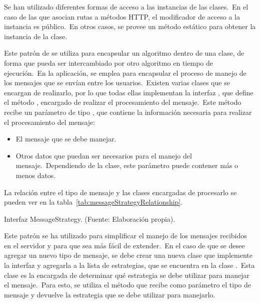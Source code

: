 Se han utilizado diferentes formas de acceso a las instancias de las clases.\ En el caso de las que asocian
rutas a métodos HTTP, el modificador de acceso a la instancia es público.\ En otros casos, se provee un método
estático para obtener la instancia de la clase.


Este patrón de  se utiliza para encapsular un algoritmo dentro de una clase, de forma que
pueda ser intercambiado por otro algoritmo en tiempo de ejecución.\ En la aplicación, se emplea para encapsular el
proceso de manejo de los mensajes que se envían entre los usuarios.\ Existen varias clases que se encargan de
realizarlo, por lo que todas ellas implementan la interfaz , que define el método
, encargado de realizar el procesamiento del mensaje.\ Este método recibe un
parámetro de tipo , que contiene la información necesaria para realizar el procesamiento
del mensaje:

\begin{itemize}
	\item El mensaje que se debe manejar.
	\item Otros datos que puedan ser necesarios para el manejo del mensaje.\ Dependiendo de la clase, este parámetro
	puede contener más o menos datos.
\end{itemize}
\label{itm:parametershandlestrategy}

La relación entre el tipo de mensaje y las clases encargadas de procesarlo se pueden ver en la
tabla~\ref{tab:messageStrategyRelationship}.

\begin{umlDiagram}
	\centering

	\caption{Interfaz MessageStrategy. (Fuente: Elaboración propia).}
\end{umlDiagram}

Este patrón se ha utilizado para simplificar el manejo de los mensajes recibidos en el servidor y para que sea más
fácil de extender.\ En el caso de que se desee agregar un nuevo tipo de mensaje, se debe crear una nueva clase que
implemente la interfaz  y agregarla a la lista de estrategias, que se encuentra en la
clase .\ Esta clase es la encargada de determinar qué estrategia se debe utilizar para
manejar el mensaje.\ Para esto, se utiliza el método  que
recibe como parámetro el tipo de mensaje y devuelve la estrategia que se debe utilizar para manejarlo.

